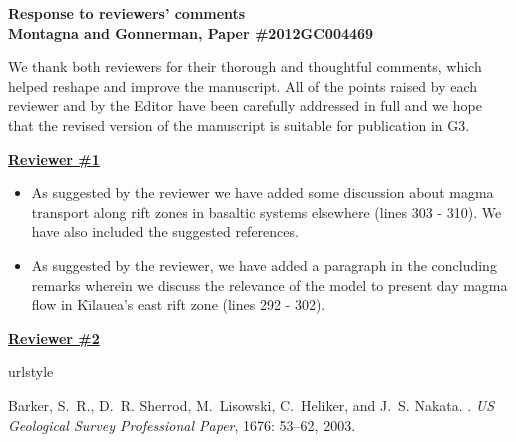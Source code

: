 \documentclass{article}
\begin{document}
 
\lstset{language=MATLAB,basicstyle=\small\ttfamily}


{\bf \noindent Response to reviewers' comments \\
Montagna and Gonnerman, Paper \#2012GC004469}

\vspace{0.5cm}

\noindent We thank both reviewers for their thorough and thoughtful comments, which helped reshape and improve the manuscript. All of the points raised by each reviewer and by the Editor have been carefully addressed in full and we hope that the revised version of the manuscript is suitable for publication in G3.

\vspace{0.5cm}

\noindent \underline{\bf Reviewer \#1}

\begin{itemize}

\item {\it }

\vspace{0.3cm}

As suggested by the reviewer we have added some discussion about magma transport along rift zones in basaltic systems elsewhere (lines 303 - 310). We have also included the suggested references.

\vspace{0.5cm}

\item {\it }

\vspace{0.3cm}

As suggested by the reviewer, we have added a paragraph in the concluding remarks wherein we discuss the relevance of the model to present day magma flow in K\={\i}lauea's east rift zone (lines 292 - 302).
\end{itemize}

\vspace{0.8cm}

\noindent \underline{\bf Reviewer \#2}

\begingroup
\renewcommand{\section}[2]{}
\begin{thebibliography}{6}
\providecommand{\natexlab}[1]{#1}
\providecommand{\url}[1]{\texttt{#1}}
\expandafter\ifx\csname urlstyle\endcsname\relax
  \providecommand{\doi}[1]{doi: #1}\else
  \providecommand{\doi}{doi: \begingroup \urlstyle{rm}\Url}\fi

Barker, S.~R., D.~R. Sherrod, M.~Lisowski, C.~Heliker, and J.~S. Nakata.
.
\newblock \emph{US Geological Survey
  Professional Paper}, 1676: 53--62, 2003.

\end{thebibliography}
\endgroup
\end{document}
